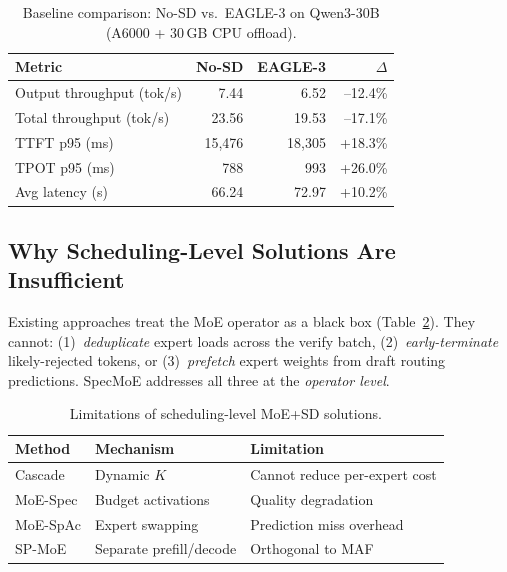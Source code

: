 \documentclass[letterpaper,twocolumn,10pt]{article}
\newcommand{\sysname}{SpecMoE\xspace}
\begin{document}
\begin{table}[t]
\centering
\small
\caption{Baseline comparison: No-SD vs.\ EAGLE-3 on Qwen3-30B
  (A6000 + 30\,GB CPU offload).}\label{tab:baseline}
\begin{tabular}{lrrr}
\toprule
\textbf{Metric} & \textbf{No-SD} & \textbf{EAGLE-3} & \textbf{$\Delta$} \\
\midrule
Output throughput (tok/s) & 7.44  & 6.52  & --12.4\% \\
Total throughput (tok/s)  & 23.56 & 19.53 & --17.1\% \\
TTFT p95 (ms)             & 15{,}476 & 18{,}305 & +18.3\% \\
TPOT p95 (ms)             & 788   & 993   & +26.0\% \\
Avg latency (s)           & 66.24 & 72.97 & +10.2\% \\
\bottomrule
\end{tabular}
\end{table}

\subsection{Why Scheduling-Level Solutions Are Insufficient}

Existing approaches treat the MoE operator as a black box (Table~\ref{tab:prior}).  They cannot:
(1)~\emph{deduplicate} expert loads across the verify batch,
(2)~\emph{early-terminate} likely-rejected tokens, or
(3)~\emph{prefetch} expert weights from draft routing predictions.
\sysname addresses all three at the \emph{operator level}.

\begin{table}[t]
\centering
\small
\caption{Limitations of scheduling-level MoE+SD solutions.}\label{tab:prior}
\begin{tabular}{p{1.5cm}p{2.5cm}p{3cm}}
\toprule
\textbf{Method} & \textbf{Mechanism} & \textbf{Limitation} \\
\midrule
Cascade & Dynamic $K$ & Cannot reduce per-expert cost \\
MoE-Spec & Budget activations & Quality degradation \\
MoE-SpAc & Expert swapping & Prediction miss overhead \\
SP-MoE & Separate prefill/decode & Orthogonal to MAF \\
\bottomrule
\end{tabular}
\end{table}

\end{document}
